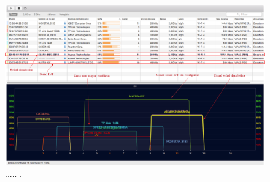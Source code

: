 \begin{landscape} %
\begin{figure}[htpb]
\centering 
\includegraphics[width=1.5\textwidth]{./Figures/wifi/01-doc.png}
\caption{..... .}
\label{fig:solapamiento}
\end{figure}
\end{landscape} %



